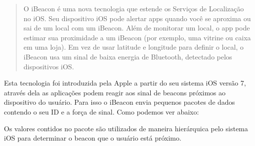 \begin{quote}
O iBeacon é uma nova tecnologia que estende os Serviços de Localização no iOS. Seu dispositivo iOS pode alertar apps quando você se aproxima ou sai de um local com um iBeacon. Além de monitorar um local, o app pode estimar sua proximidade a um iBeacon (por exemplo, uma vitrine ou caixa em uma loja). Em vez de usar latitude e longitude para definir o local, o iBeacon usa um sinal de baixa energia de Bluetooth, detectado pelos dispositivos iOS. \cite{Apple}
\end{quote}

Esta tecnologia foi introduzida pela Apple a partir do seu sistema iOS versão 7, através dela as aplicações podem reagir aos sinal de beacons próximos ao dispositivo do usuário. Para isso o iBeacon envia pequenos pacotes de dados contendo o seu ID e a força de sinal. Como podemos ver abaixo:

\begin{quadro}[h!]	
	\centering
\end{quadro}

Os valores contidos no pacote são utilizados de maneira hierárquica pelo sistema iOS para determinar o beacon que o usuário está próximo.

\begin{quadro}[h!]	
	\centering
\end{quadro}
 
